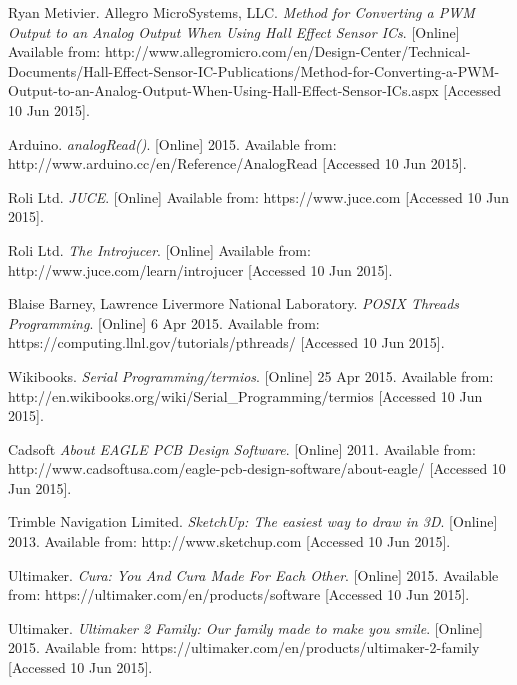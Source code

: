 \begin{thebibliography}{99}
Ryan Metivier. Allegro MicroSystems, LLC. \textit{Method for Converting a PWM Output to an Analog Output When Using Hall Effect Sensor ICs}. [Online] Available from: http://www.allegromicro.com/en/Design-Center/Technical-Documents/Hall-Effect-Sensor-IC-Publications/Method-for-Converting-a-PWM-Output-to-an-Analog-Output-When-Using-Hall-Effect-Sensor-ICs.aspx [Accessed 10 Jun 2015].

Arduino. \textit{analogRead()}. [Online] 2015. Available from: http://www.arduino.cc/en/Reference/AnalogRead [Accessed 10 Jun 2015].

Roli Ltd. \textit{JUCE}. [Online] Available from: https://www.juce.com [Accessed 10 Jun 2015].

Roli Ltd. \textit{The Introjucer}. [Online] Available from: http://www.juce.com/learn/introjucer  [Accessed 10 Jun 2015].

Blaise Barney, Lawrence Livermore National Laboratory. \textit{POSIX Threads Programming}. [Online] 6 Apr 2015. Available from: https://computing.llnl.gov/tutorials/pthreads/ [Accessed 10 Jun 2015].

Wikibooks. \textit{Serial Programming/termios}. [Online] 25 Apr 2015. Available from: http://en.wikibooks.org/wiki/Serial\_Programming/termios [Accessed 10 Jun 2015].

Cadsoft \textit{About EAGLE PCB Design Software}. [Online] 2011. Available from: http://www.cadsoftusa.com/eagle-pcb-design-software/about-eagle/ [Accessed 10 Jun 2015].

Trimble Navigation Limited. \textit{SketchUp: The easiest way to draw in 3D}. [Online] 2013. Available from: http://www.sketchup.com [Accessed 10 Jun 2015].

Ultimaker. \textit{Cura: You And Cura Made For Each Other}. [Online] 2015. Available from: https://ultimaker.com/en/products/software [Accessed 10 Jun 2015].

Ultimaker. \textit{Ultimaker 2 Family: Our family made to make you smile}. [Online] 2015. Available from: https://ultimaker.com/en/products/ultimaker-2-family [Accessed 10 Jun 2015].











\end{thebibliography}
